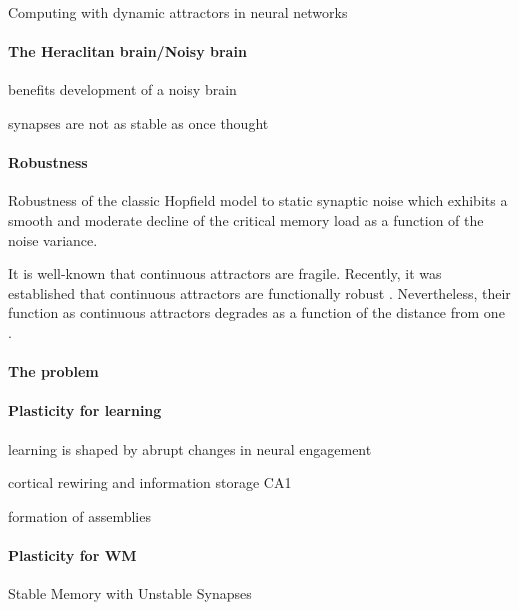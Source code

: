 \documentclass{article}
\theoremstyle{definition} \newtheorem{definition}{Definition}
\theoremstyle{remark} \newtheorem{remark}{Remark}
\newcounter{ct}
\begin{document}
Computing with dynamic attractors in neural networks \citep{hirsch1995computing}

\paragraph{The Heraclitan brain/Noisy brain}
\citep{cheung2010noisybrain}
\citep{rolls2010noisybrain}
benefits\citep{mcdonnell2011benefits}
development of a noisy brain \citep{mcintosh2010development}

synapses are not as stable as once thought \citep{susman2019memory}


\paragraph{Robustness}
Robustness of the classic Hopfield model to static synaptic noise\citep{sompolinsky1986neural, tirozzi1991chaos}
which exhibits a smooth and moderate decline of the critical memory load as a function of the noise variance.

\citep{kappel2018dynamic}

It is well-known that continuous attractors are fragile. 
Recently, it was established that continuous attractors are functionally robust \citep{Sagodi2024a}.
Nevertheless, their function as continuous attractors degrades as a function of the distance from one \citep{Sagodi2024a}.

\paragraph{The problem}


\paragraph{Plasticity for learning}
learning is shaped by abrupt changes in neural engagement \citep{hennig2021learning}

cortical rewiring and information storage \citep{chklovskii2004cortical}
CA1 \citep{bittner2017behavioral} 

formation of assemblies \citep{litwin2014formation}


\paragraph{Plasticity for WM}
\citep{kilpatrick2018wm}

Stable Memory with Unstable Synapses \citep{susman2019memory}
\end{document}
